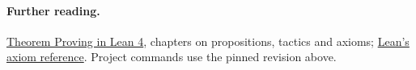 \documentclass[11pt]{article}
\begin{document}
\paragraph{Further reading.} \href{https://docs.lean-lang.org/theorem_proving_in_lean4/}{Theorem Proving in Lean 4}, chapters on propositions, tactics and axioms; \href{https://lean-lang.org/doc/reference/latest/Axioms}{Lean's axiom reference}. Project commands use the pinned revision above.
\end{document}
